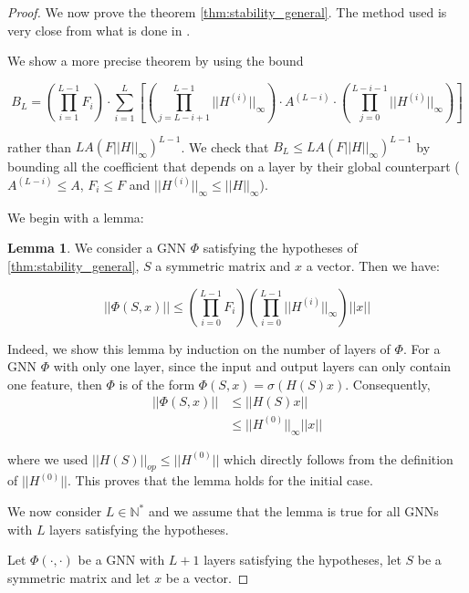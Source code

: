 \documentclass[11pt,a4paper]{article}
\newcommand{\op}[1]{|| #1 ||_{op}}
\newcommand{\ninf}[1]{|| #1 ||_\infty}
\newcommand{\Sum}[2]{\overset{#2}{\underset{#1}{\sum}}}
\newcommand{\Prod}[2]{\overset{#2}{\underset{#1}{\prod}}}
\theoremstyle{definition}
\newtheorem{lemma}[theorem]{Lemma}
\renewcommand{\leq}{\leqslant}
\begin{document}
\begin{proof}
            We now prove the theorem \ref{thm:stability_general}. The method used is very close from what is done in \cite{gama2020stability}.
            
            We show a more precise theorem by using the bound 
            
            $$B_L = \left( \underset{i=1}{\overset{L-1}{\prod}} F_i \right)  \cdot \Sum{i=1}{L} \left[ (\underset{j=L-i+1}{\overset{L-1}{\prod}} \ninf{H ^{(i)}}) \cdot A^{(L-i)} \cdot (\underset{j=0}{\overset{L-i-1}{\prod}} \ninf{H ^{(i)}}) \right] $$
            
            rather than $L A (F \ninf{H} )^ {L-1}$. We check that $B_L \leq L A (F \ninf{H} )^ {L-1}$ by bounding all the coefficient that depends on a layer by their global counterpart ($A^{(L-i)} \leq A$, $F_i \leq F$ and $\ninf{H^{(i)}} \leq \ninf{H}$).
            
            We begin with a lemma:

            \begin{lemma}
                We consider a GNN $\Phi$ satisfying the hypotheses of \ref{thm:stability_general}, $S$ a symmetric matrix and $x$ a vector. Then we have:

                    $$ || \Phi(S,x) || \leq \left( \Prod{i=0}{L-1} F_i \right) \left( \Prod{i=0}{L-1} \ninf{H^{(i)}} \right) ||x|| $$
            \end{lemma}

            Indeed, we show this lemma by induction on the number of layers of $\Phi$. For a GNN $\Phi$ with only one layer, since the input and output layers can only contain one feature, then $\Phi$ is of the form $\Phi(S,x) = \sigma(H(S)x)$. Consequently, 
            \begin{align*}
                || \Phi (S,x) || &\leq || H(S) x || \\
                                 &\leq \ninf{H^{(0)}} ||x||
            \end{align*}

            where we used $\op{H(S)} \leq ||H^{(0)}||$ which directly follows from the definition of $||H^{(0)}||$. This proves that the lemma holds for the initial case.

            We now consider $L \in \mathbb{N}^*$ and we assume that the lemma is true for all GNNs with $L$ layers satisfying the hypotheses.

            Let $\Phi (\cdot,\cdot)$ be a GNN with $L+1$ layers satisfying the hypotheses, let $S$ be a symmetric matrix and let $x$ be a vector.


\end{proof}
\end{document}

